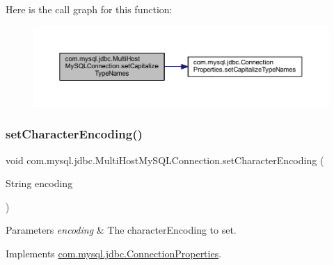 Here is the call graph for this function\+:
\nopagebreak
\begin{figure}[H]
\begin{center}
\leavevmode
\includegraphics[width=350pt]{classcom_1_1mysql_1_1jdbc_1_1_multi_host_my_s_q_l_connection_ac07f4457ad5a749c3abc81dec0fb0490_cgraph}
\end{center}
\end{figure}
\mbox{\label{classcom_1_1mysql_1_1jdbc_1_1_multi_host_my_s_q_l_connection_a1510cc6e9c664cb49832bb26ae148e06}} 
\subsubsection{\texorpdfstring{set\+Character\+Encoding()}{setCharacterEncoding()}}
{\footnotesize\ttfamily void com.\+mysql.\+jdbc.\+Multi\+Host\+My\+S\+Q\+L\+Connection.\+set\+Character\+Encoding (\begin{DoxyParamCaption}\item[{String}]{encoding }\end{DoxyParamCaption})}


\begin{DoxyParams}{Parameters}
{\em encoding} & The character\+Encoding to set. \\
\hline
\end{DoxyParams}


Implements \mbox{\hyperlink{interfacecom_1_1mysql_1_1jdbc_1_1_connection_properties_ac5db9f2921918f0a5d1f55ce5e093948}{com.\+mysql.\+jdbc.\+Connection\+Properties}}.

